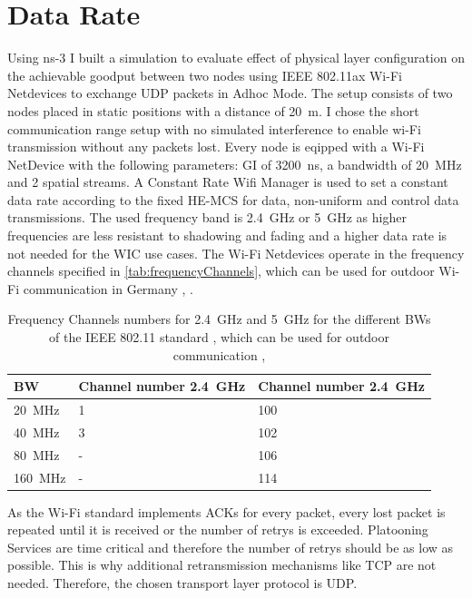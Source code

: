 \section{Data Rate}
\label{sec:DataRate}
Using ns-3 I built a simulation to evaluate effect of physical layer configuration on the achievable goodput between two nodes using IEEE 802.11ax Wi-Fi Netdevices to exchange UDP packets in Adhoc Mode.
The setup consists of two nodes placed in static positions with a distance of \SI{20}{\metre}. I chose the short communication range setup with no simulated interference to enable wi-Fi transmission without any packets lost.
Every node is eqipped with a Wi-Fi NetDevice with the following parameters: \ac{GI} of \SI{3200}{\nano\second}, a bandwidth of \SI{20}{\mega\hertz} and 2 spatial streams.
A Constant Rate Wifi Manager is used to set a constant data rate according to the fixed HE-\ac{MCS} for data, non-uniform and control data transmissions. The used frequency band is \SI{2.4}{\giga\hertz} or \SI{5}{\giga\hertz} as
higher frequencies are less resistant to shadowing and fading and a higher data rate is not needed for the \ac{WIC} use cases.
The Wi-Fi Netdevices operate in the frequency channels specified in \autoref{tab:frequencyChannels}, which can be used for
outdoor Wi-Fi communication in Germany \cite{freq_plan_24G}, \cite{freq_plan_5G}.

\begin{table}
	\centering
	\begin{tabular}{>{\centering}p{2cm}p{4cm}p{4cm}}
		\toprule
		\ac{BW} & Channel number \SI{2.4}{\giga\hertz} & Channel number \SI{2.4}{\giga\hertz}\\
		\midrule
		\SI{20}{\mega\hertz} & \num{1}&
		\num{100} \\
		\SI{40}{\mega\hertz} &
		\num{3}
		& \num{102} \\
		\SI{80}{\mega\hertz} &
		- & \num{106} \\
		\SI{160}{\mega\hertz} & -
		& \num{114} \\
		\bottomrule
	\end{tabular}
	\caption{Frequency Channels numbers for \SI{2.4}{\giga\hertz} and \SI{5}{\giga\hertz} for the different \acf{BW}s of the IEEE 802.11 standard \cite{noauthor_ieee_2021-1}, which can be used for
	outdoor communication \cite{freq_plan_24G}, \cite{freq_plan_5G}}
	\label{tab:frequencyChannels}
\end{table}

As the Wi-Fi standard implements ACKs for every packet, every lost packet is repeated until it is received or the number of retrys is
exceeded. Platooning Services are time critical and therefore the number of retrys should be as low as possible. This is why additional
retransmission mechanisms like TCP are not needed. Therefore, the chosen transport layer protocol is UDP.

